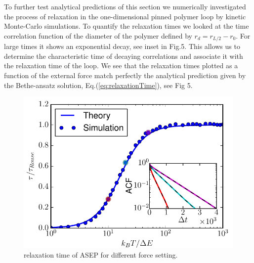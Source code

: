 \documentclass[aps,showpacs,twocolumn,floatfix,prx,superscriptaddress]{revtex4-1}
\begin{document}
 To further test analytical predictions of this section we numerically investigated the process of relaxation in the one-dimensional pinned polymer loop by kinetic Monte-Carlo simulations. To quantify the relaxation times we looked at the time correlation function of the diameter of the polymer defined by $r_d = r_{L/2} - r_0$. For large times it shows an exponential decay, see inset in Fig.5. This allows us to determine the characteristic time of decaying correlations and associate it with the relaxation time of the loop. We see that the relaxation times plotted as a function of the external force match perfectly the analytical prediction given by the Bethe-ansatz solution, Eq.(\ref{eq:relaxationTime}), see Fig 5.


\begin{figure}[htpb]
   \centering
   \includegraphics[width=1.0\linewidth]{relaxation1D}
   \caption{relaxation time of ASEP for different force setting.}
   \label{fig:relaxation1D}
\end{figure}
\end{document}
